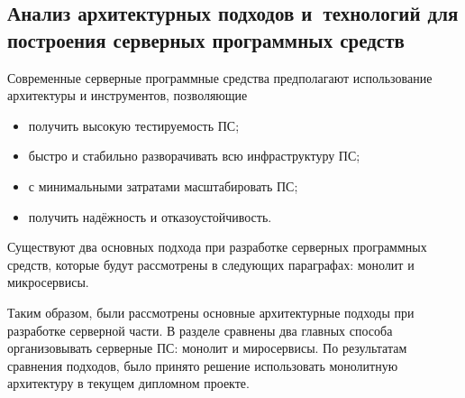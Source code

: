 \subsection{Анализ архитектурных подходов и~технологий для построения серверных программных средств}
\label{sec:analysis:research:backArch}

Современные серверные программные средства предполагают использование архитектуры и инструментов, позволяющие

\begin{itemize}
\item получить высокую тестируемость ПС;
\item быстро и стабильно разворачивать всю инфраструктуру ПС;
\item с минимальными затратами масштабировать ПС;
\item получить надёжность и отказоустойчивость.
\end{itemize}

Существуют два основных подхода при разработке серверных программных средств, которые будут рассмотрены в следующих параграфах: монолит и микросервисы.




Таким образом, были рассмотрены основные архитектурные подходы при разработке серверной части. В разделе сравнены два главных способа организовывать серверные ПС: монолит и миросервисы. По результатам сравнения подходов, было принято решение использовать монолитную архитектуру в текущем дипломном проекте.
